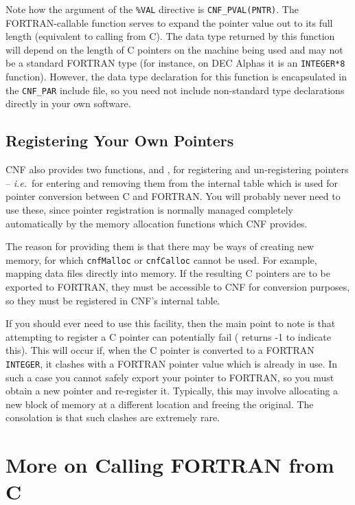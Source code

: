 \documentclass[twoside,11pt,nolof]{starlink}
\begin{document}
Note how the argument of the \texttt{\%VAL} directive is
\texttt{CNF\_PVAL(PNTR)}. The FORTRAN-callable
function serves to expand the pointer value out to its full length
(equivalent to calling
from C).
The data type returned by this function will depend on the length of C pointers
on the machine being used and may not be a standard FORTRAN type (for
instance, on DEC Alphas it is an \texttt{INTEGER*8}
function). However, the data type declaration for this function is
encapsulated in the \texttt{CNF\_PAR} include file, so you need not
include non-standard type declarations directly in your own software.

\subsection{Registering Your Own
Pointers}

CNF also provides two functions,
and
,
for registering and un-registering pointers --
\textit{i.e.}\ for entering and removing them from the internal table which is
used for pointer conversion between C and FORTRAN. You will probably
never need to use these, since pointer registration is normally
managed completely automatically by the memory allocation functions
which CNF provides.

The reason for providing them is that there may be ways of
creating new memory, for which \texttt{cnfMalloc} or \texttt{cnfCalloc} cannot
be used.
For example, mapping data files directly into memory.
If the resulting C pointers are to be exported to FORTRAN,
they must be accessible to CNF for conversion purposes, so they must
be registered in CNF's internal table.

If you should ever need to use this facility, then the main point to
note is that attempting to register a C pointer can potentially fail
( returns -1 to indicate this).
This will occur if, when the C pointer is converted to a FORTRAN
\texttt{INTEGER}, it
clashes with a FORTRAN pointer value which is already in use. In such
a case you cannot safely export your pointer to FORTRAN, so you must
obtain a new pointer and re-register it. Typically, this may involve
allocating a new block of memory at a different location and freeing
the original. The consolation is that such clashes are extremely rare.

\section{\label{f77_ffromc}More on
Calling FORTRAN from C}
\end{document}
